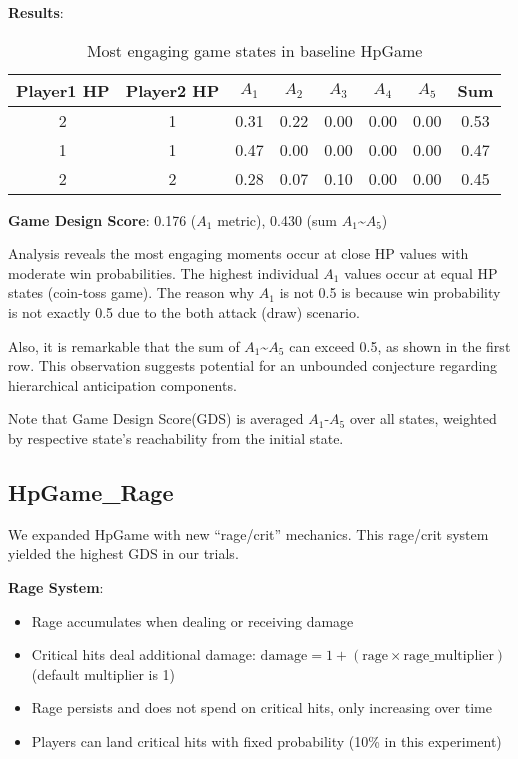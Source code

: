 \documentclass{article}
\begin{document}
\textbf{Results}:

\begin{table}[h]
\centering
\begin{tabular}{|c|c|c|c|c|c|c|c|}
\hline
Player1 HP & Player2 HP & $A_1$ & $A_2$ & $A_3$ & $A_4$ & $A_5$ & Sum \\
\hline
2 & 1 & 0.31 & 0.22 & 0.00 & 0.00 & 0.00 & 0.53 \\
1 & 1 & 0.47 & 0.00 & 0.00 & 0.00 & 0.00 & 0.47 \\
2 & 2 & 0.28 & 0.07 & 0.10 & 0.00 & 0.00 & 0.45 \\
\hline
\end{tabular}
\caption{Most engaging game states in baseline HpGame}
\end{table}

\textbf{Game Design Score}: 0.176 ($A_1$ metric), 0.430 (sum $A_1$\textasciitilde$A_5$)

Analysis reveals the most engaging moments occur at close HP values with moderate win probabilities. The highest individual $A_1$ values occur at equal HP states (coin-toss game). The reason why $A_1$ is not 0.5 is because win probability is not exactly 0.5 due to the both attack (draw) scenario.

Also, it is remarkable that the sum of $A_1$\textasciitilde$A_5$ can exceed 0.5, as shown in the first row. This observation suggests potential for an unbounded conjecture regarding hierarchical anticipation components.

Note that Game Design Score(GDS) is averaged $A_1$-$A_5$ over all states, weighted by respective state's reachability from the initial state.

\subsection{HpGame\_Rage}

We expanded HpGame with new ``rage/crit'' mechanics. This rage/crit system yielded the highest GDS in our trials.

\textbf{Rage System}: 
\begin{itemize}
\item Rage accumulates when dealing or receiving damage
\item Critical hits deal additional damage: $\text{damage} = 1 + (\text{rage} \times \text{rage\_multiplier})$ (default multiplier is 1)
\item Rage persists and does not spend on critical hits, only increasing over time
\item Players can land critical hits with fixed probability (10\% in this experiment)
\end{itemize}
\end{document}
